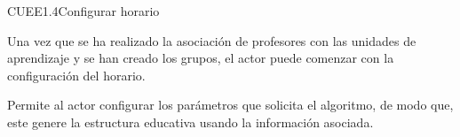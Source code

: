 
\begin{UseCase}{CUEE1.4}{Configurar horario}{	
		
	Una vez que se ha realizado la asociación de profesores con las unidades de aprendizaje y se han creado los grupos, el actor puede comenzar con la configuración del horario.
	 
	Permite al actor configurar los parámetros que solicita el algoritmo, de modo que, este genere la estructura educativa usando la información asociada.
}


\end{UseCase}
